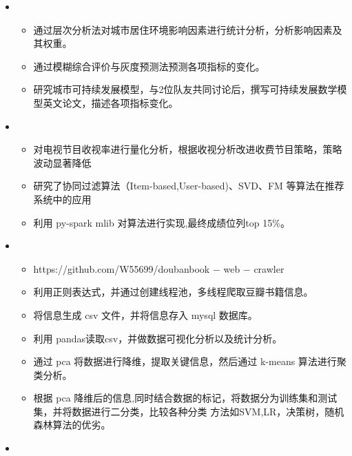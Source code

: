   \begin{itemize}[leftmargin=*]
    \item
      {\small
      \begin{itemize}
      \item 通过层次分析法对城市居住环境影响因素进行统计分析，分析影响因素及其权重。
        \item 通过模糊综合评价与灰度预测法预测各项指标的变化。
        \item 研究城市可持续发展模型，与2位队友共同讨论后，撰写可持续发展数学模型英文论文，描述各项指标变化。
      \end{itemize}
      }
    
    \item
      {\small
      \begin{itemize}
        \item 对电视节目收视率进行量化分析，根据收视分析改进收费节目策略，策略波动显著降低
        \item 研究了协同过滤算法（Item-based,User-based)、SVD、FM 等算法在推荐系统中的应用
        \item 利用 py-spark mlib 对算法进行实现,最终成绩位列top 15\%。
      \end{itemize}
      }


    \item
      {\small
      \begin{itemize}
       \item https://github.com/W55699/doubanbook − web − crawler
       \item 利用正则表达式，并通过创建线程池，多线程爬取豆瓣书籍信息。
       \item 将信息生成 csv 文件，并将信息存入 mysql 数据库。
       \item 利用 pandas读取csv，并做数据可视化分析以及统计分析。
       \item 通过 pca 将数据进行降维，提取关键信息，然后通过 k-means 算法进行聚类分析。 
       \item 根据 pca 降维后的信息,同时结合数据的标记，将数据分为训练集和测试集，并将数据进行二分类，比较各种分类
             方法如SVM,LR，决策树，随机森林算法的优劣。
      \end{itemize}
      }
    \item
      {\small
      \begin{itemize}
      

\end{itemize}}
\end{itemize}
